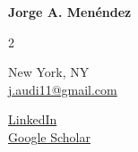
\begin{center}
    {\LARGE \textbf{Jorge A. Men\'{e}ndez}} \\ \vspace{4pt}
    \begin{multicols}{2}
    \begin{flushleft}
        New York, NY \\
        \href{mailto:j.audi11@gmail.com}{j.audi11@gmail.com}
    \end{flushleft}
    
    \begin{flushright}
        \href{https://www.linkedin.com/in/jorge-aurelio-menendez-21b768b5/}{LinkedIn} \\
        \href{https://scholar.google.co.uk/citations?user=YPAOERQAAAAJ}{Google Scholar}
    \end{flushright}
    \end{multicols}
\end{center}
\vspace{-20pt}